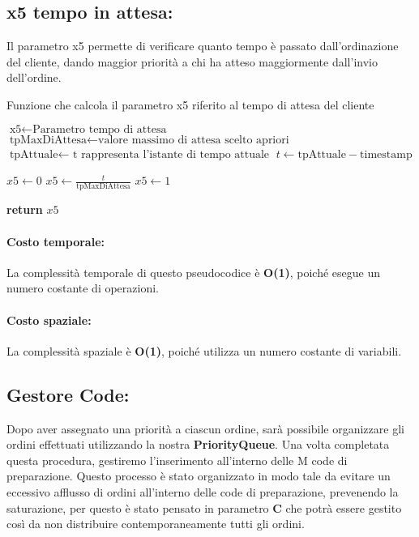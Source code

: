 \subsection{x5 tempo in attesa:}
Il  parametro x5 permette di verificare quanto tempo è passato dall'ordinazione del cliente, dando maggior priorità a chi ha atteso maggiormente dall'invio dell'ordine.
\begin{algorithm}[h]
	\begin{algorithmic}[h!]
		\caption{Funzione che calcola il parametro x5 riferito al tempo di attesa del cliente}
		\medskip
		\State $\text{x5} \gets \text{Parametro tempo di attesa}$
		\State $\text{tpMaxDiAttesa} \gets \text{valore massimo di attesa scelto apriori}$
		\State $\text{tpAttuale} \gets \text{ t rappresenta l'istante di tempo attuale}$
		\State $t \gets \text{tpAttuale} - \text{timestamp}$  
		\medskip
		
		\State $x5 \gets 0$  
		\State $x5 \gets \frac{t}{\text{tpMaxDiAttesa}}$
		\Else
		\State $x5 \gets 1$ 
		\EndIf
		
		\State \textbf{return} $x5$
		\EndFunction
	\end{algorithmic}
\end{algorithm}

\paragraph{Costo temporale:}
La complessità temporale di questo pseudocodice è \textbf{O(1)}, poiché esegue un numero costante di operazioni.

\paragraph{Costo spaziale:}
La complessità spaziale è \textbf{O(1)}, poiché utilizza un numero costante di variabili.

\subsection{Gestore Code:}
Dopo aver assegnato una priorità a ciascun ordine, sarà possibile organizzare gli ordini effettuati utilizzando la nostra \textbf{PriorityQueue}. Una volta completata questa procedura, gestiremo l'inserimento all'interno delle M code di preparazione. Questo processo è stato organizzato in modo tale da evitare un eccessivo afflusso di ordini all'interno delle code di preparazione, prevenendo la saturazione, per questo è stato pensato in parametro \textbf{C} che potrà essere gestito così da non distribuire contemporaneamente tutti gli ordini.

